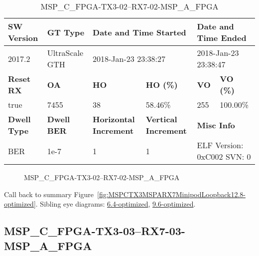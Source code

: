 \begin{table}[h]
\centering
\caption{MSP\_C\_FPGA-TX3-02--RX7-02-MSP\_A\_FPGA}
\label{tab:MSPCFPGATX302RX702MSPAFPGA12.8-optimized}
\begin{tabular}{@{}|l|l|l|l|l|l|@{}}
\toprule
\textbf{SW Version}                & \textbf{GT Type}   & \multicolumn{2}{l|}{\textbf{Date and Time Started}}            & \multicolumn{2}{l|}{\textbf{Date and Time Ended}}        \\ \midrule
2017.2                       & UltraScale GTH          & \multicolumn{2}{l|}{2018-Jan-23 23:38:27}                   & \multicolumn{2}{l|}{2018-Jan-23 23:38:47}               \\ \midrule
\textbf{Reset RX}                  & \textbf{OA} & \textbf{HO}   & \textbf{HO (\%)} & \textbf{VO} & \textbf{VO (\%)} \\ \midrule
true & 7455        & 38          & 58.46\%        & 255        & 100.00\%       \\ \midrule
\textbf{Dwell Type}                & \textbf{Dwell BER} & \textbf{Horizontal Increment} & \textbf{Vertical Increment}    & \multicolumn{2}{l|}{\textbf{Misc Info}}                  \\ \midrule
BER                            & 1e-7        & 1        & 1           & \multicolumn{2}{l|}{ELF Version: 0xC002 SVN: 0}                         \\ \bottomrule
\end{tabular}
\end{table}

\begin{figure}[h]
\caption{MSP\_C\_FPGA-TX3-02--RX7-02-MSP\_A\_FPGA} \label{fig:MSPCFPGATX302RX702MSPAFPGA12.8-optimized}
\end{figure}

Call back to summary Figure~\ref{fig:MSPCTX3MSPARX7MinipodLoopback12.8-optimized}.
Sibling eye diagrams: \hyperref[sec:MSPCFPGATX302RX702MSPAFPGA6.4-optimized]{6.4-optimized}, \hyperref[sec:MSPCFPGATX302RX702MSPAFPGA9.6-optimized]{9.6-optimized}.

\clearpage
\newpage


\subsection{MSP\_C\_FPGA-TX3-03--RX7-03-MSP\_A\_FPGA}\label{sec:MSPCFPGATX303RX703MSPAFPGA12.8-optimized}

